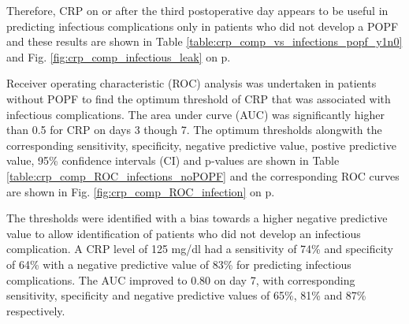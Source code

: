 Therefore, CRP on or after the third postoperative day appears to be useful in predicting infectious complications only in patients who did not develop a POPF and these results are shown in Table \ref{table:crp_comp_vs_infections_popf_y1n0} and Fig. \ref{fig:crp_comp_infectious_leak} on p\pageref{fig:crp_comp_infectious_leak}. 

Receiver operating characteristic (ROC) analysis was undertaken in patients without POPF to find the optimum threshold of CRP that was associated with infectious complications. The area under curve (AUC) was significantly higher than 0.5 for CRP on days 3 though 7. The optimum thresholds alongwith the corresponding sensitivity, specificity, negative predictive value, postive predictive value, 95\% confidence intervals (CI) and p-values are shown in Table \ref{table:crp_comp_ROC_infections_noPOPF} and the corresponding ROC curves are shown in Fig. \ref{fig:crp_comp_ROC_infection} on p\pageref{fig:crp_comp_ROC_infection}.

The thresholds were identified with a bias towards a higher negative predictive value to allow identification of patients who did not develop an infectious complication. A CRP level of 125 mg/dl had a sensitivity of 74\% and specificity of 64\% with a negative predictive value of 83\% for predicting infectious complications. The AUC improved to 0.80 on day 7, with corresponding sensitivity, specificity and negative predictive values of 65\%, 81\% and 87\% respectively.


